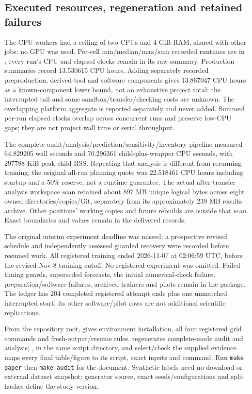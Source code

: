 \subsection{Executed resources, regeneration and retained failures}
\label{app:resources}
The CPU workers had a ceiling of two CPUs and 4 GiB RAM, shared with other jobs; no GPU was used. Per-cell min/median/max/sum recorded runtimes are in ; every run's CPU and elapsed clocks remain in its raw summary. Production summaries record 13.530615 CPU hours. Adding separately recorded preproduction, derived-tool and software components gives 13.867047 CPU hours as a known-component lower bound, not an exhaustive project total: the interrupted tail and some sandbox/transfer/checking costs are unknown. The overlapping platform aggregate is reported separately and never added. Summed per-run elapsed clocks overlap across concurrent runs and preserve low-CPU gaps; they are not project wall time or serial throughput.

The complete audit/analysis/prediction/sensitivity/inventory pipeline measured 64.829205 wall seconds and 70.296361 child-plus-wrapper CPU seconds, with 297788 KiB peak child RSS. Repeating that analysis is different from rerunning training; the original all-run planning quote was 22.518461 CPU hours including startup and a 50\% reserve, not a runtime guarantee. The actual after-transfer analysis workspace scan retained about 897 MB unique logical bytes across eight owned directories/copies/Git, separately from its approximately 239 MB results archive. Other positions' working copies and future rebuilds are outside that scan. Exact boundaries and values remain in the delivered records.

The original interim experiment deadline was missed; a prospective revised schedule and independently assessed guarded recovery were recorded before resumed work. All registered training ended 2026-11-07 at 02:06:59 UTC, before the revised Nov 8 training cutoff. No registered experiment was omitted. Failed timing guards, superseded forecasts, the initial numerical-check failure, preparation/software failures, archived trainers and pilots remain in the package. The ledger has 204 completed registered attempt ends plus one unmatched interrupted start; its other software/pilot rows are not additional scientific replications.

From the repository root,  gives environment installation, all four registered grid commands and fresh-output/resume rules.  regenerates complete-mode audit and analysis; ,  in the same script directory, and  select/check the supplied evidence.  maps every final table/figure to its script, exact inputs and command. Run \texttt{make paper} then \texttt{make audit} for the document. Synthetic labels need no download or external dataset snapshot: generator source, exact seeds/configurations and split hashes define the study version.

